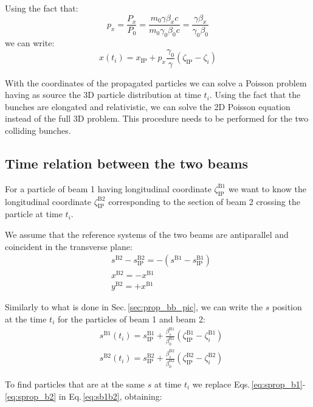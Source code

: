 Using the fact that:
\begin{equation}
p_x=\frac{P_x}{P_0}=\frac{m_0 \gamma \beta_x c}{m_0 \gamma_0 \beta_0 c} =\frac{ \gamma \beta_x}{ \gamma_0 \beta_0} 
\end{equation}
we can write:
\begin{equation}
x \left( t_i \right)
= x_\text{IP} + p_x\frac{\gamma_0}{\gamma}\left(\zeta_\text{IP} -  \zeta_i \right)
\end{equation}

With the coordinates of the propagated particles we can solve a Poisson problem having as source the 3D particle distribution at time $t_i$. Using the fact that the bunches are elongated and relativistic, we can solve the 2D Poisson equation instead of the full 3D problem. This procedure needs to be performed for the two colliding bunches.

\subsection{Time relation between the two beams}
For a particle of beam 1 having longitudinal coordinate $\zeta_\text{IP}^\text{B1}$ we want to know the longitudinal coordinate $\zeta_\text{IP}^\text{B2}$ corresponding to the section of beam 2 crossing the particle at time $t_i$.

We assume that the reference systems of the two beams are antiparallel and coincident in the transverse plane:
\begin{align}
&s^\text{B2} - s_\text{IP}^\text{B2} = 
- \left( s^\text{B1} - s_\text{IP}^\text{B1}\right)
\label{eq:sb1b2}\\
&x^\text{B2} = - x^\text{B1}\\
&y^\text{B2} = + x^\text{B1}
\end{align}

Similarly to what is done in Sec.\,\ref{sec:prop_bb_pic}, we can write the $s$ position at the time $t_i$ for the particles of beam 1 and beam 2:
\begin{align}
&s^\text{B1} \left( t_i \right)
= s^\text{B1}_\text{IP} + \frac{\beta^\text{B1}_s}{\beta_0^\text{B1}}\left(\zeta^\text{B1}_\text{IP} -  \zeta^\text{B1}_i \right)
\label{eq:sprop_b1}\\
&s^\text{B2} \left( t_i \right)
= s^\text{B2}_\text{IP} + \frac{\beta^\text{B2}_s}{\beta_0^\text{B2}}\left(\zeta^\text{B2}_\text{IP} -  \zeta^\text{B2}_i \right)
\label{eq:sprop_b2}
\end{align}

To find particles that are at the same $s$ at time $t_i$ we replace Eqs.\,\ref{eq:sprop_b1}-\ref{eq:sprop_b2} in Eq.\,\ref{eq:sb1b2}, obtaining:


